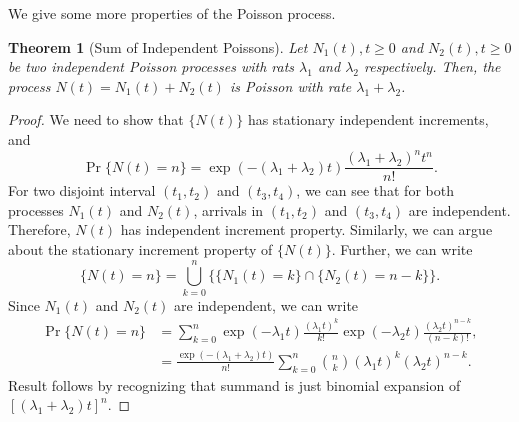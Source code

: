 \documentclass[a4paper,10pt]{article}
\theoremstyle{plain}
\newtheorem{thm}{Theorem}[section]
\theoremstyle{definition}
\begin{document}
We give some more properties of the Poisson process.
\begin{thm}[Sum of Independent Poissons] Let ${N_1(t), t \geqslant  0}$ and ${N_2(t), t \geqslant  0}$ be two independent Poisson processes with rats $\lambda_{1}$ and $\lambda_{2}$ respectively. Then, the process $N(t)= N_{1}(t) +N_{2}(t)$ is Poisson with rate $\lambda_{1}+\lambda_{2}$.
\end{thm}
\begin{proof} We need to show that $\{N(t)\}$ has stationary independent increments, and 
\begin{equation*}
	\Pr\{N(t)=n\}=   \exp(-(\lambda_{1}+\lambda_{2})t)\frac{(\lambda_{1}+\lambda_{2})^n t^n}{n!}.
\end{equation*}
For two disjoint interval $(t_{1}, t_{2})$ and $(t_3,t_4)$, we can see that for both processes $N_{1}(t)$ and $N_2(t)$,  arrivals in $(t_{1}, t_{2})$ and $(t_3,t_{4})$ are independent. Therefore, $N(t)$ has independent increment property. Similarly, we can argue about the stationary increment property of $\{N(t)\}$. Further, we can write 
\begin{equation*}
	\{N(t)=n\} = \bigcup_{k=0}^n\{\{N_1(t) = k\}\cap\{N_2(t) = n-k\}\}.
\end{equation*}
Since $N_1(t)$ and $N_2(t)$ are independent, we can write
\begin{align*}
	\Pr\{N(t)=n\} &= \sum_{k=0}^n\exp(-\lambda_1t)\frac{(\lambda_1t)^k}{k!}\exp(-\lambda_2t)\frac{(\lambda_2t)^{n-k}}{(n-k)!},\\
	&= \frac{\exp(-(\lambda_1+\lambda_2)t)}{n!}\sum_{k=0}^n\binom{n}{k}(\lambda_1t)^k(\lambda_2t)^{n-k}.%
\end{align*}
Result follows by recognizing that summand is just binomial expansion of $[(\lambda_1 + \lambda_2)t]^n$.
\end{proof}
\end{document}
